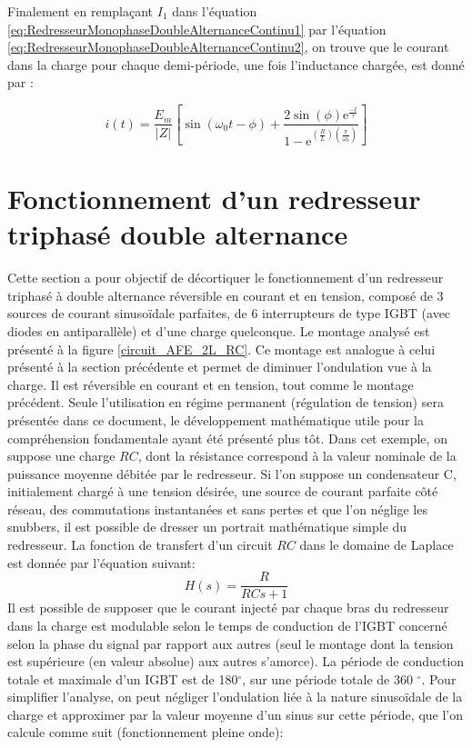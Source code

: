 Finalement en remplaçant $I_1$ dans l'équation \ref{eq:RedresseurMonophaseDoubleAlternanceContinu1} par l'équation \ref{eq:RedresseurMonophaseDoubleAlternanceContinu2}, on trouve que le courant dans la charge pour chaque demi-période, une fois l'inductance chargée, est donné par :

\begin{equation}
	i(t) = \frac{E_m}{|Z|}\left[\sin{(\omega_0 t - \phi)} + \frac{2\sin(\phi) \mbox{e}^{\frac{-t}{\tau}}}{1-\mbox{e}^{\left(\frac{R}{L}\right)\left(\frac{\pi}{\omega_0}\right)}} \right] 
\end{equation}

\section{Fonctionnement d'un redresseur triphasé double alternance}
Cette section a pour objectif de décortiquer le fonctionnement d'un redresseur triphasé à double alternance réversible en courant et en tension, composé de 3 sources de courant sinusoïdale parfaites, de 6 interrupteurs de type IGBT (avec diodes en antiparallèle) et d'une charge quelconque. Le montage analysé est présenté à la figure \ref{circuit_AFE_2L_RC}. Ce montage est analogue à celui présenté à la section précédente et permet de diminuer l'ondulation vue à la charge. Il est réversible en courant et en tension, tout comme le montage précédent. Seule l'utilisation en régime permanent (régulation de tension) sera présentée dans ce document, le développement mathématique utile pour la compréhension fondamentale ayant été présenté plus tôt. Dans cet exemple, on suppose une charge $RC$, dont la résistance correspond à la valeur nominale de la puissance moyenne débitée par le redresseur. Si l'on suppose un condensateur C, initialement chargé à une tension désirée, une source de courant parfaite côté réseau, des commutations instantanées et sans pertes et que l'on néglige les snubbers, il est possible de dresser un portrait mathématique simple du redresseur. La fonction de transfert d'un circuit $RC$ dans le domaine de Laplace est donnée par l'équation suivant:
\begin{equation}
H(s) = \frac{R}{RCs + 1}
\end{equation}
Il est possible de supposer que le courant injecté par chaque bras du redresseur dans la charge est modulable selon le temps de conduction de l'IGBT concerné selon la phase du signal par rapport aux autres (seul le montage dont la tension est supérieure (en valeur absolue) aux autres s'amorce). La période de conduction totale et maximale d'un IGBT est de 180$^\circ$, sur une période totale de 360 $^\circ$. Pour simplifier l'analyse, on peut négliger l'ondulation liée à la nature sinusoïdale de la charge et approximer par la valeur moyenne d'un sinus sur cette période, que l'on calcule comme suit (fonctionnement pleine onde):
